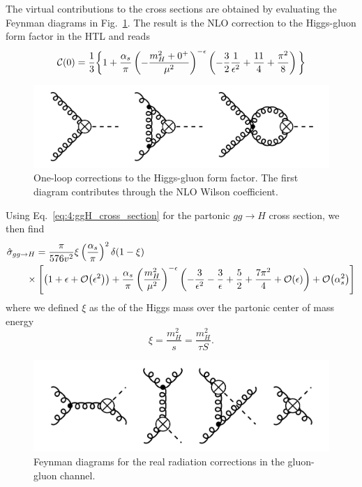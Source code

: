 The virtual contributions to the cross sections are obtained by evaluating the Feynman diagrams in Fig.~\ref{fig:4:ggH}. The result is the NLO correction to the Higgs-gluon form factor in the \acs{HTL} and reads
\begin{equation}
\mathcal{C}(0) = \frac{1}{3} \bigg \lbrace 1 + \frac{\alpha_s}{\pi} \left(- \frac{m_H^2 + 0^+}{\mu^2} \right)^{-\epsilon} \left(-\frac{3}{2} \frac{1}{\epsilon^2} + \frac{11}{4} + \frac{\pi^2}{8} \right) \bigg \rbrace
\label{eq:4:HTL_formfactor}
\end{equation}
\begin{figure}[h]
\centering
\includegraphics[scale=0.3]{Images/NLO_Feynman_diagrams/ggH.pdf}
\caption{One-loop corrections to the Higgs-gluon form factor. The first diagram contributes through the NLO Wilson coefficient.}
\label{fig:4:ggH}
\end{figure}
Using Eq.~\eqref{eq:4:ggH_cross_section} for the partonic $gg \rightarrow H$ cross section, we then find
\begin{equation}
\begin{split}
&\hat{\sigma}_{gg \rightarrow H} = \frac{\pi}{576 v^2} \xi  \left(\frac{\alpha_s}{\pi} \right)^2 \delta(1 - \xi) \\
&\qquad \times \left[ \left( 1 + \epsilon + \mathcal{O}\!\left(\epsilon^2\right) \right) + \frac{\alpha_s}{\pi} \left(\frac{m_H^2}{\mu^2} \right)^{-\epsilon} \left(-\frac{3}{\epsilon^2} - \frac{3}{\epsilon} + \frac{5}{2} + \frac{7 \pi^2}{4} + \mathcal{O}\!\left(\epsilon\right) \right) + \mathcal{O}\!\left(\alpha_s^2\right) \right]
\end{split}
\end{equation}
where we defined $\xi$ as the of the Higgs mass over the partonic center of mass energy
\begin{equation}
  \xi = \frac{m_H^2}{s} = \frac{m_H^2}{\tau S}.
\end{equation}
\begin{figure}
  \centering
  \includegraphics[scale=0.3]{Images/NLO_Feynman_diagrams/ggHg.pdf}
  \caption{Feynman diagrams for the real radiation corrections in the gluon-gluon channel.}
  \label{fig:4:ggHg}
\end{figure}

